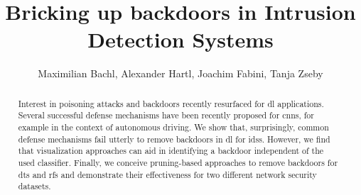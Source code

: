 \documentclass[10pt,sigconf,letterpaper,dvipsnames]{acmart}
\begin{document}
\title{Bricking up backdoors in Intrusion Detection Systems}



\begin{abstract}
Interest in poisoning attacks and backdoors recently resurfaced for \gls{dl} applications. Several successful defense mechanisms have been recently proposed for \glspl{cnn}, for example in the context of autonomous driving. We show that, surprisingly, common defense mechanisms fail utterly to remove backdoors in \gls{dl} for \glspl{ids}. However, we find that visualization approaches can aid in identifying a backdoor independent of the used classifier. Finally, we conceive pruning-based approaches to remove backdoors for \glspl{dt} and \glspl{rf} and demonstrate their effectiveness for two different %
network security datasets.
\end{abstract}

\author{Maximilian Bachl, Alexander Hartl, Joachim Fabini, Tanja Zseby}


\end{document}
